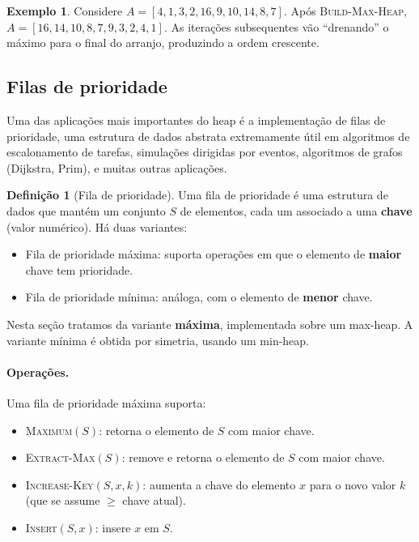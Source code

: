 \documentclass[9pt,a4paper]{extarticle}
\newcommand{\impt}[1]{\textcolor{important}{#1}}
\theoremstyle{definition}
\newtheorem{definition}{Definição}[section]
\newtheorem{example}{Exemplo}[section]
\begin{document}
\begin{example}
Considere $A = [4, 1, 3, 2, 16, 9, 10, 14, 8, 7]$. Após
\textsc{Build-Max-Heap}, $A = [16, 14, 10, 8, 7, 9, 3, 2, 4, 1]$. As
iterações subsequentes vão ``drenando'' o máximo para o final do arranjo,
produzindo a ordem crescente.
\end{example}

\subsection{Filas de prioridade}
 
Uma das aplicações mais importantes do heap é a implementação de
\impt{filas de prioridade}, uma estrutura de dados abstrata extremamente
útil em algoritmos de escalonamento de tarefas, simulações dirigidas por
eventos, algoritmos de grafos (Dijkstra, Prim), e muitas outras
aplicações.
 
\begin{definition}[Fila de prioridade]
Uma \impt{fila de prioridade} é uma estrutura de dados que mantém um
conjunto $S$ de elementos, cada um associado a uma \textbf{chave} (valor
numérico). Há duas variantes:
\begin{itemize}
  \item \impt{Fila de prioridade máxima}: suporta operações em que o
    elemento de \textbf{maior} chave tem prioridade.
  \item \impt{Fila de prioridade mínima}: análoga, com o elemento de
    \textbf{menor} chave.
\end{itemize}
\end{definition}
 
Nesta seção tratamos da variante \textbf{máxima}, implementada sobre um
max-heap. A variante mínima é obtida por simetria, usando um min-heap.
 
\paragraph{Operações.} Uma fila de prioridade máxima suporta:
\begin{itemize}
  \item \textsc{Maximum}$(S)$: retorna o elemento de $S$ com maior chave.
  \item \textsc{Extract-Max}$(S)$: remove e retorna o elemento de $S$ com
    maior chave.
  \item \textsc{Increase-Key}$(S, x, k)$: aumenta a chave do elemento $x$
    para o novo valor $k$ (que se assume $\ge$ chave atual).
  \item \textsc{Insert}$(S, x)$: insere $x$ em $S$.
\end{itemize}
 
\end{document}
